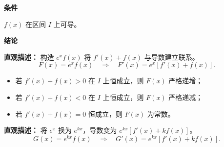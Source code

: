 \begin{statementbox}
	\textbf{\textcolor{CStatement}{条件}}
	\begin{description}[style=nextline, leftmargin=2.8em, labelsep=0.5em, itemsep=0.35em]
		\item[\textbf{\textcolor{CStatement}{条件1（函数可导）：}}] $f(x)$ 在区间 $I$ 上可导。
	\end{description}

	\textbf{\textcolor{CStatement}{结论}}

	\begin{description}[style=nextline, leftmargin=2.8em, labelsep=0.5em, itemsep=0.45em]
		\item[\textbf{\textcolor{CStatement}{结论一（导数结构）：}}]
			\textbf{\textcolor{CStatement}{直观描述：}}
			构造 $e^x f(x)$ 将 $f'(x)+f(x)$ 与导数建立联系。
			\[
				F(x)=e^{x}f(x) \quad \Rightarrow \quad F'(x)=e^{x}[f'(x)+f(x)].
			\]
			\begin{itemize}
			\item 若 $f'(x)+f(x)>0$ 在 $I$ 上恒成立，则 $F(x)$ 严格递增；
			\item 若 $f'(x)+f(x)<0$ 在 $I$ 上恒成立，则 $F(x)$ 严格递减；
			\item 若 $f'(x)+f(x)=0$ 恒成立，则 $F(x)$ 为常数。
		\end{itemize}
		\item[\textbf{\textcolor{CStatement}{常见变形（常数因子）：}}]
			\textbf{\textcolor{CStatement}{直观描述：}}
			将 $e^x$ 换为 $e^{kx}$，导数变为 $e^{kx}[f'(x)+kf(x)]$。
			\[
				G(x)=e^{kx}f(x) \quad \Rightarrow \quad G'(x)=e^{kx}[f'(x)+kf(x)].
			\]
	\end{description}
\end{statementbox}
